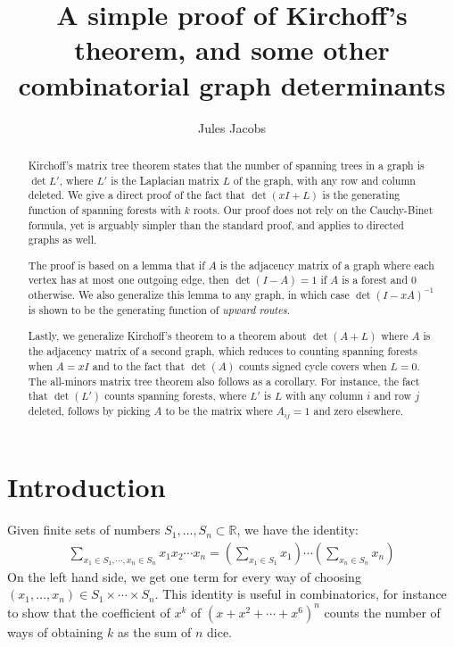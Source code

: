 \documentclass[a4paper, 11pt]{article}
\title{A simple proof of Kirchoff's theorem, and some other combinatorial graph determinants}
\author{Jules Jacobs}
\newcommand{\R}{\mathbb{R}}
\theoremstyle{definition}
\begin{document}
\maketitle

\begin{abstract}
  Kirchoff's matrix tree theorem states that the number of spanning trees in a graph is $\det L'$, where $L'$ is the Laplacian matrix $L$ of the graph, with any row and column deleted. We give a direct proof of the fact that $\det(xI + L)$ is the generating function of spanning forests with $k$ roots. Our proof does not rely on the Cauchy-Binet formula, yet is arguably simpler than the standard proof, and applies to directed graphs as well.

  The proof is based on a lemma that if $A$ is the adjacency matrix of a graph where each vertex has at most one outgoing edge, then $\det(I - A) = 1$ if $A$ is a forest and $0$ otherwise. We also generalize this lemma to any graph, in which case $\det(I-xA)^{-1}$ is shown to be the generating function of \emph{upward routes}.

  Lastly, we generalize Kirchoff's theorem to a theorem about $\det(A + L)$ where $A$ is the adjacency matrix of a second graph, which reduces to counting spanning forests when $A = xI$ and to the fact that $\det(A)$ counts signed cycle covers when $L = 0$. The all-minors matrix tree theorem also follows as a corollary. For instance, the fact that $\det(L')$ counts spanning forests, where $L'$ is $L$ with any column $i$ and row $j$ deleted, follows by picking $A$ to be the matrix where $A_{ij} = 1$ and zero elsewhere.
\end{abstract}

\section{Introduction}

Given finite sets of numbers $S_1, \dots, S_n \subset \R$, we have the identity:
\begin{align*}
  \sum_{x_1 \in S_1, \cdots, x_n \in S_n} x_1 x_2 \cdots x_n =
  \left( \sum_{x_1 \in S_1} x_1 \right) \cdots \left( \sum_{x_n \in S_n} x_n \right)
\end{align*}
On the left hand side, we get one term for every way of choosing $(x_1,\dots,x_n)\in S_1 \times \cdots \times S_n$. This identity is useful in combinatorics, for instance to show that the coefficient of $x^k$ of $(x + x^2 + \cdots + x^6)^n$ counts the number of ways of obtaining $k$ as the sum of $n$ dice.
\end{document}
